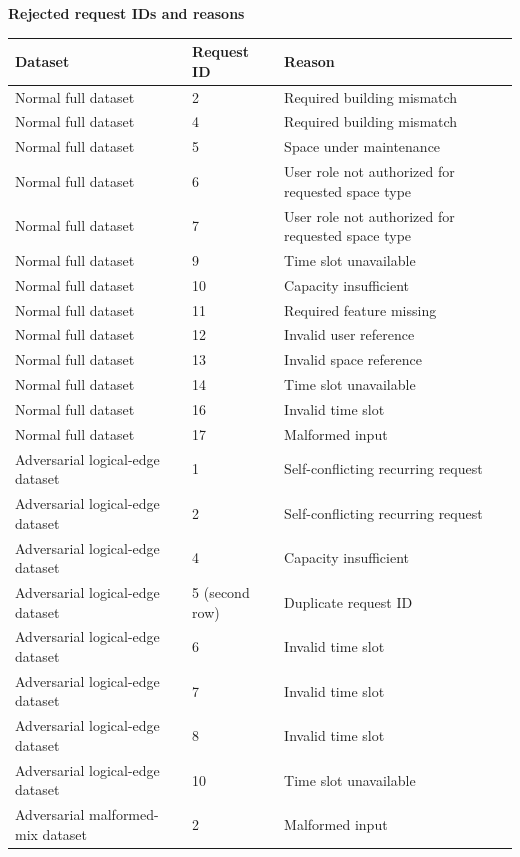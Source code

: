 \documentclass[12pt,a4paper]{article}
\begin{document}
\textbf{Rejected request IDs and reasons}
\begin{landscape}
\begin{center}
\footnotesize
\begin{longtable}{@{} p{4.2cm} p{2.2cm} p{13.0cm} @{}}
\toprule
\textbf{Dataset} & \textbf{Request ID} & \textbf{Reason} \\
\midrule
\endhead
Normal full dataset & 2 & Required building mismatch \\
Normal full dataset & 4 & Required building mismatch \\
Normal full dataset & 5 & Space under maintenance \\
Normal full dataset & 6 & User role not authorized for requested space type \\
Normal full dataset & 7 & User role not authorized for requested space type \\
Normal full dataset & 9 & Time slot unavailable \\
Normal full dataset & 10 & Capacity insufficient \\
Normal full dataset & 11 & Required feature missing \\
Normal full dataset & 12 & Invalid user reference \\
Normal full dataset & 13 & Invalid space reference \\
Normal full dataset & 14 & Time slot unavailable \\
Normal full dataset & 16 & Invalid time slot \\
Normal full dataset & 17 & Malformed input \\
Adversarial logical-edge dataset & 1 & Self-conflicting recurring request \\
Adversarial logical-edge dataset & 2 & Self-conflicting recurring request \\
Adversarial logical-edge dataset & 4 & Capacity insufficient \\
Adversarial logical-edge dataset & 5 (second row) & Duplicate request ID \\
Adversarial logical-edge dataset & 6 & Invalid time slot \\
Adversarial logical-edge dataset & 7 & Invalid time slot \\
Adversarial logical-edge dataset & 8 & Invalid time slot \\
Adversarial logical-edge dataset & 10 & Time slot unavailable \\
Adversarial malformed-mix dataset & 2 & Malformed input \\

\end{longtable}
\end{center}
\end{landscape}
\end{document}
